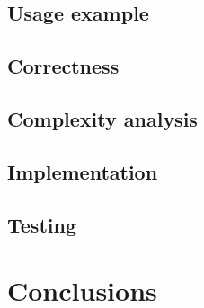 \documentclass[12pt]{article}
\begin{document}
\subsection{Usage example}

\subsection{Correctness}

\subsection{Complexity analysis}

\subsection{Implementation}

\subsection{Testing}

\section{Conclusions}



\end{document}
